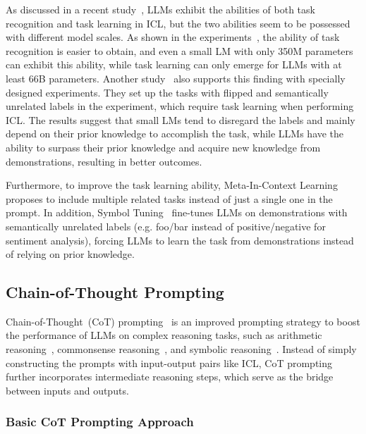 {{{{{{As discussed in a recent study~\cite{Pan-2023-arXiv-what}, LLMs exhibit the abilities of both task recognition and task learning in ICL, but the two abilities seem to be possessed with different model scales. As shown in the experiments~\cite{Pan-2023-arXiv-what}, the ability of task recognition is easier to obtain, and even a small LM with only 350M parameters can exhibit this ability, while task learning can only emerge for LLMs with at least 66B parameters. Another study~\cite{Wei-arxiv-2023-Larger} also supports this finding with specially designed experiments. They set up the tasks with flipped and semantically unrelated labels in the experiment, which require task learning when performing ICL. The results suggest that small LMs tend to disregard the labels and mainly depend on their prior knowledge to accomplish the task, while LLMs have the ability to surpass their prior knowledge and acquire new knowledge from demonstrations, resulting in better outcomes. 

Furthermore, to improve the task learning ability, Meta-In-Context Learning~\cite{Forno-2023-arXiv-meta} proposes to include multiple related tasks instead of just a single one in the prompt. In addition, Symbol Tuning~\cite{Wei-2023-arXiv-symbol} fine-tunes LLMs on demonstrations with semantically unrelated labels (e.g. foo/bar instead of positive/negative for sentiment analysis), forcing LLMs to learn the task from demonstrations instead of relying on prior knowledge.

\subsection{Chain-of-Thought Prompting}
\label{subsec-cot}

Chain-of-Thought~(CoT) prompting~\cite{Wei-arxiv-2022-chain, Chu-arxiv-2023-A} is an improved prompting strategy to boost the performance of LLMs on complex reasoning tasks, such as arithmetic reasoning~\cite{Miao-ACL-2020-A}, commonsense reasoning~\cite{Talmor-naacl-2019-CommonsenseQA}, and symbolic reasoning~\cite{Wei-arxiv-2022-chain}. Instead of simply constructing the prompts with input-output pairs like ICL, CoT prompting further incorporates intermediate reasoning steps, which serve as the bridge between inputs and outputs.

\subsubsection{Basic CoT Prompting Approach}

}}}}}}
